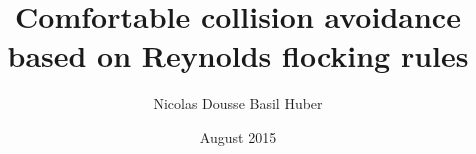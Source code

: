 \documentclass[a4paper, twocolumn]{article}
\begin{document}
\title{Comfortable collision avoidance based on Reynolds flocking rules}
\author{Nicolas Dousse \quad\quad Basil Huber }
\date{August 2015}


\twocolumn[
	\maketitle
	\begin{abstract}
	
	\vspace{10pt}
	\end{abstract}
]












\printbibliography[title=References]
\end{document}
